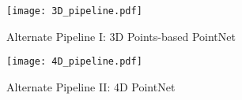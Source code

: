 \begin{figure}[ht!]
    \centering
    \texttt{[image: 3D\_pipeline.pdf]}
    \caption{Alternate Pipeline I: 3D Points-based PointNet}
    \label{fig:3D_pipeline}
\end{figure}

\begin{figure}[ht!]
    \centering
    \texttt{[image: 4D\_pipeline.pdf]}
    \vspace{-1cm}
    \caption{Alternate Pipeline II: 4D PointNet}
    \label{fig:4D_pipeline}
\end{figure}


\let\cleardoublepage\clearpage